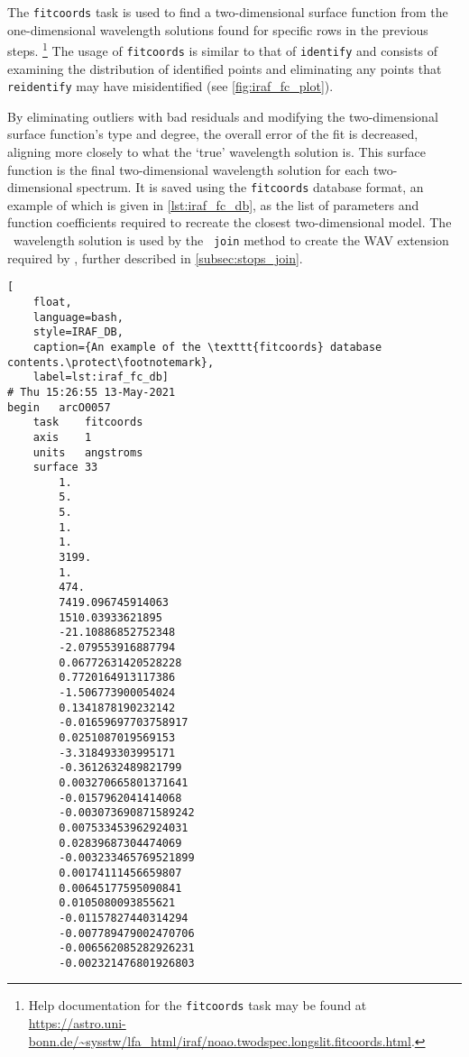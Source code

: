 The \texttt{fitcoords} task is used to find a two-dimensional surface function from the one-dimensional wavelength solutions found for specific rows in the previous steps.%
\footnote{Help documentation for the \texttt{fitcoords} task may be found at \url{https://astro.uni-bonn.de/~sysstw/lfa_html/iraf/noao.twodspec.longslit.fitcoords.html}.}
The usage of \texttt{fitcoords} is similar to that of \texttt{identify} and consists of examining the distribution of identified points and eliminating any points that \texttt{reidentify} may have misidentified (see \autoref{fig:iraf_fc_plot}).

By eliminating outliers with bad residuals and modifying the two-dimensional surface function's type and degree, the overall error of the fit is decreased, aligning more closely to what the `true' wavelength solution is.
This surface function is the final two-dimensional wavelength solution for each two-dimensional spectrum. It is saved using the \texttt{fitcoords} database format, an example of which is given in \autoref{lst:iraf_fc_db}, as the list of parameters and function coefficients required to recreate the closest two-dimensional model. The \iraf\ wavelength solution is used by the \stops\ \texttt{join} method to create the \gls{WAV} extension required by \polsalt, further described in \autoref{subsec:stops_join}.

\begin{lstlisting}[
    float,
    language=bash,
    style=IRAF_DB,
    caption={An example of the \texttt{fitcoords} database contents.\protect\footnotemark},
    label=lst:iraf_fc_db]
# Thu 15:26:55 13-May-2021
begin	arcO0057
	task	fitcoords
	axis	1
	units	angstroms
	surface	33
		1.
		5.
		5.
		1.
		1.
		3199.
		1.
		474.
		7419.096745914063
		1510.03933621895
		-21.10886852752348
		-2.079553916887794
		0.06772631420528228
		0.7720164913117386
		-1.506773900054024
		0.1341878190232142
		-0.01659697703758917
		0.0251087019569153
		-3.318493303995171
		-0.3612632489821799
		0.003270665801371641
		-0.0157962041414068
		-0.003073690871589242
		0.007533453962924031
		0.02839687304474069
		-0.003233465769521899
		0.00174111456659807
		0.00645177595090841
		0.0105080093855621
		-0.01157827440314294
		-0.007789479002470706
		-0.006562085282926231
		-0.002321476801926803

\end{lstlisting}

